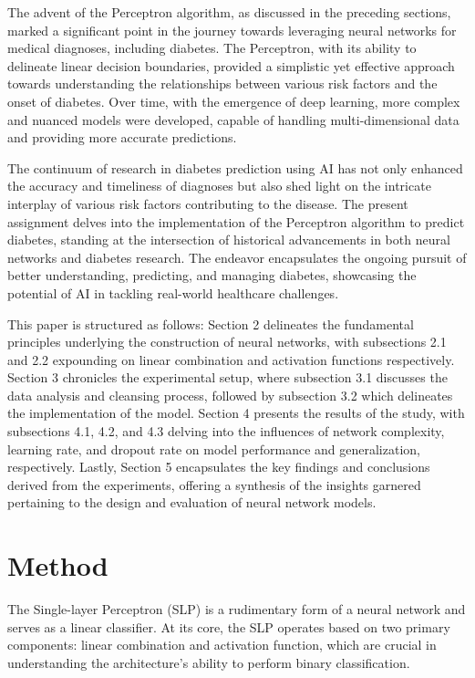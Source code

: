 \documentclass[10pt,twocolumn,letterpaper]{article}
\begin{document}
The advent of the Perceptron algorithm, as discussed in the preceding sections, marked a significant point in the journey towards leveraging neural networks for medical diagnoses, including diabetes. The Perceptron, with its ability to delineate linear decision boundaries, provided a simplistic yet effective approach towards understanding the relationships between various risk factors and the onset of diabetes. Over time, with the emergence of deep learning, more complex and nuanced models were developed, capable of handling multi-dimensional data and providing more accurate predictions.

The continuum of research in diabetes prediction using AI has not only enhanced the accuracy and timeliness of diagnoses but also shed light on the intricate interplay of various risk factors contributing to the disease. The present assignment delves into the implementation of the Perceptron algorithm to predict diabetes, standing at the intersection of historical advancements in both neural networks and diabetes research. The endeavor encapsulates the ongoing pursuit of better understanding, predicting, and managing diabetes, showcasing the potential of AI in tackling real-world healthcare challenges.

This paper is structured as follows: Section 2 delineates the fundamental principles underlying the construction of neural networks, with subsections 2.1 and 2.2 expounding on linear combination and activation functions respectively. Section 3 chronicles the experimental setup, where subsection 3.1 discusses the data analysis and cleansing process, followed by subsection 3.2 which delineates the implementation of the model. Section 4 presents the results of the study, with subsections 4.1, 4.2, and 4.3 delving into the influences of network complexity, learning rate, and dropout rate on model performance and generalization, respectively. Lastly, Section 5 encapsulates the key findings and conclusions derived from the experiments, offering a synthesis of the insights garnered pertaining to the design and evaluation of neural network models.

\section{Method}

The Single-layer Perceptron (SLP) is a rudimentary form of a neural network and serves as a linear classifier. At its core, the SLP operates based on two primary components: linear combination and activation function, which are crucial in understanding the architecture's ability to perform binary classification.
\end{document}
